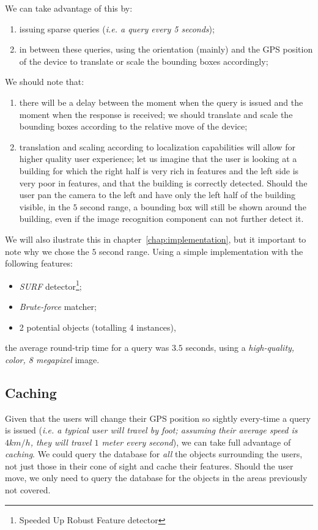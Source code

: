 \documentclass[a4paper,onecolumn,oneside,titlepage,11pt]{report}
\begin{document}
We can take advantage of this by:
\begin{enumerate}
	\item issuing sparse queries (\emph{i.e. a query every 5 seconds});
	\item in between these queries, using the orientation (mainly) and the GPS position of the device to translate or scale the bounding boxes accordingly;
\end{enumerate}
We should note that:
\begin{enumerate}
	\item there will be a delay between the moment when the query is issued and the moment when the response is received; we should translate and scale the bounding boxes according to the relative move of the device;
	\item translation and scaling according to localization capabilities will allow for higher quality user experience; let us imagine that the user is looking at a building for which the right half is very rich in features and the left side is very poor in features, and that the building is correctly detected. Should the user pan the camera to the left and have only the left half of the building visible, in the $5$ second range, a bounding box will still be shown around the building, even if the image recognition component can not further detect it.
\end{enumerate}
We will also ilustrate this in chapter~\ref{chap:implementation}, but it important to note why we chose the $5$ second range. Using a simple implementation with the following features:
\begin{itemize}
	\item \emph{SURF} detector\footnote{Speeded Up Robust Feature detector};
	\item \emph{Brute-force} matcher;
	\item 2 potential objects (totalling 4 instances), 
\end{itemize}
the average round-trip time for a query was $3.5$ seconds, using a \emph{high-quality, color, 8 megapixel} image.

\subsection{Caching}
Given that the users will change their GPS position so sightly every-time a query is issued (\emph{i.e. a typical user will travel by foot; assuming their average speed is $4 km/h$, they will travel $1$ meter every second}), we can take full advantage of \emph{caching}. We could query the database for \emph{all} the objects surrounding  the users, not just those in their cone of sight and cache their features. Should the user move, we only need to query the database for the objects in the areas previously not covered.
\end{document}
